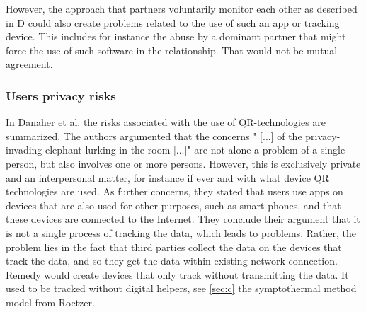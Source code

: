 However, the approach that partners voluntarily monitor each other as described in D could also create problems related to the use of such an app or tracking device. This includes for instance the abuse by a dominant partner that might force the use of such software in the relationship. That would not be mutual agreement.



\subsubsection{Users privacy risks}
In Danaher et al. \cite{doi:10.1080/15265161.2017.1422294} the risks associated with the use of \acs{QR}-technologies are summarized.
The authors argumented that the concerns " [...] of the privacy-invading elephant lurking in the room [...]" are not alone a problem of a single person, but also involves one or more persons. However, this is exclusively private and an interpersonal matter, for instance if ever and with what device \acs{QR} technologies are used.
As further concerns, they stated that users use apps on devices that are also used for other purposes, such as smart phones, and that these devices are connected to the Internet. 
They conclude their argument that it is not a single process of tracking the data, which leads to problems. Rather, the problem lies in the fact that third parties collect the data on the devices that track the data, and so they get the data within existing network connection.
Remedy would create devices that only track without transmitting the data.
It used to be tracked without digital helpers, see  \ref{sec:c} the symptothermal method model from Roetzer.
